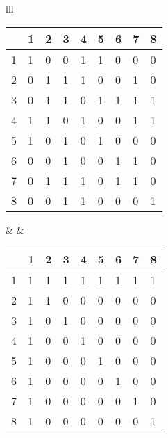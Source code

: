 \documentclass[11pt,fleqn]{exam}
\begin{document}
\begin{center}
\begin{tabular}{lll}
\begin{tabular}{l|llllllll}
&     1 & 2 & 3 & 4 & 5 & 6 & 7 & 8 \\ \hline
1 &   1 & 0 & 0 & 1 & 1 & 0 & 0 & 0 \\
2 &   0 & 1 & 1 & 1 & 0 & 0 & 1 & 0 \\
3 &   0 & 1 & 1 & 0 & 1 & 1 & 1 & 1 \\
4 &   1 & 1 & 0 & 1 & 0 & 0 & 1 & 1 \\
5 &   1 & 0 & 1 & 0 & 1 & 0 & 0 & 0 \\
6 &   0 & 0 & 1 & 0 & 0 & 1 & 1 & 0 \\
7 &   0 & 1 & 1 & 1 & 0 & 1 & 1 & 0 \\
8 &   0 & 0 & 1 & 1 & 0 & 0 & 0 & 1
\end{tabular}
&
\hspace{.5in}
&
\begin{tabular}{l|llllllll}
&     1 & 2 & 3 & 4 & 5 & 6 & 7 & 8 \\ \hline
1 &   1 & 1 & 1 & 1 & 1 & 1 & 1 & 1 \\
2 &   1 & 1 & 0 & 0 & 0 & 0 & 0 & 0 \\
3 &   1 & 0 & 1 & 0 & 0 & 0 & 0 & 0 \\
4 &   1 & 0 & 0 & 1 & 0 & 0 & 0 & 0 \\
5 &   1 & 0 & 0 & 0 & 1 & 0 & 0 & 0 \\
6 &   1 & 0 & 0 & 0 & 0 & 1 & 0 & 0 \\
7 &   1 & 0 & 0 & 0 & 0 & 0 & 1 & 0 \\
8 &   1 & 0 & 0 & 0 & 0 & 0 & 0 & 1 \\
\end{tabular}
\end{tabular}
\end{center}


\end{document}
